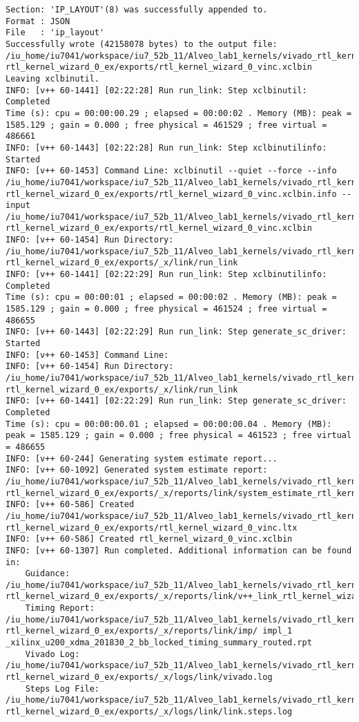 \begin{lstlisting}[label=code:log_file, caption=Содержимое log-файла, basicstyle=\tiny]
Section: 'IP_LAYOUT'(8) was successfully appended to.
Format : JSON
File   : 'ip_layout'
Successfully wrote (42158078 bytes) to the output file: /iu_home/iu7041/workspace/iu7_52b_11/Alveo_lab1_kernels/vivado_rtl_kernel/ rtl_kernel_wizard_0_ex/exports/rtl_kernel_wizard_0_vinc.xclbin
Leaving xclbinutil.
INFO: [v++ 60-1441] [02:22:28] Run run_link: Step xclbinutil: Completed
Time (s): cpu = 00:00:00.29 ; elapsed = 00:00:02 . Memory (MB): peak = 1585.129 ; gain = 0.000 ; free physical = 461529 ; free virtual = 486661
INFO: [v++ 60-1443] [02:22:28] Run run_link: Step xclbinutilinfo: Started
INFO: [v++ 60-1453] Command Line: xclbinutil --quiet --force --info /iu_home/iu7041/workspace/iu7_52b_11/Alveo_lab1_kernels/vivado_rtl_kernel/ rtl_kernel_wizard_0_ex/exports/rtl_kernel_wizard_0_vinc.xclbin.info --input /iu_home/iu7041/workspace/iu7_52b_11/Alveo_lab1_kernels/vivado_rtl_kernel/ rtl_kernel_wizard_0_ex/exports/rtl_kernel_wizard_0_vinc.xclbin
INFO: [v++ 60-1454] Run Directory: /iu_home/iu7041/workspace/iu7_52b_11/Alveo_lab1_kernels/vivado_rtl_kernel/ rtl_kernel_wizard_0_ex/exports/_x/link/run_link
INFO: [v++ 60-1441] [02:22:29] Run run_link: Step xclbinutilinfo: Completed
Time (s): cpu = 00:00:01 ; elapsed = 00:00:02 . Memory (MB): peak = 1585.129 ; gain = 0.000 ; free physical = 461524 ; free virtual = 486655
INFO: [v++ 60-1443] [02:22:29] Run run_link: Step generate_sc_driver: Started
INFO: [v++ 60-1453] Command Line: 
INFO: [v++ 60-1454] Run Directory: /iu_home/iu7041/workspace/iu7_52b_11/Alveo_lab1_kernels/vivado_rtl_kernel/ rtl_kernel_wizard_0_ex/exports/_x/link/run_link
INFO: [v++ 60-1441] [02:22:29] Run run_link: Step generate_sc_driver: Completed
Time (s): cpu = 00:00:00.01 ; elapsed = 00:00:00.04 . Memory (MB): peak = 1585.129 ; gain = 0.000 ; free physical = 461523 ; free virtual = 486655
INFO: [v++ 60-244] Generating system estimate report...
INFO: [v++ 60-1092] Generated system estimate report: /iu_home/iu7041/workspace/iu7_52b_11/Alveo_lab1_kernels/vivado_rtl_kernel/ rtl_kernel_wizard_0_ex/exports/_x/reports/link/system_estimate_rtl_kernel_wizard_0_vinc.xtxt
INFO: [v++ 60-586] Created /iu_home/iu7041/workspace/iu7_52b_11/Alveo_lab1_kernels/vivado_rtl_kernel/ rtl_kernel_wizard_0_ex/exports/rtl_kernel_wizard_0_vinc.ltx
INFO: [v++ 60-586] Created rtl_kernel_wizard_0_vinc.xclbin
INFO: [v++ 60-1307] Run completed. Additional information can be found in:
	Guidance: /iu_home/iu7041/workspace/iu7_52b_11/Alveo_lab1_kernels/vivado_rtl_kernel/ rtl_kernel_wizard_0_ex/exports/_x/reports/link/v++_link_rtl_kernel_wizard_0_vinc_guidance.html
	Timing Report: /iu_home/iu7041/workspace/iu7_52b_11/Alveo_lab1_kernels/vivado_rtl_kernel/ rtl_kernel_wizard_0_ex/exports/_x/reports/link/imp/ impl_1 _xilinx_u200_xdma_201830_2_bb_locked_timing_summary_routed.rpt
	Vivado Log: /iu_home/iu7041/workspace/iu7_52b_11/Alveo_lab1_kernels/vivado_rtl_kernel/ rtl_kernel_wizard_0_ex/exports/_x/logs/link/vivado.log
	Steps Log File: /iu_home/iu7041/workspace/iu7_52b_11/Alveo_lab1_kernels/vivado_rtl_kernel/ rtl_kernel_wizard_0_ex/exports/_x/logs/link/link.steps.log


\end{lstlisting}
